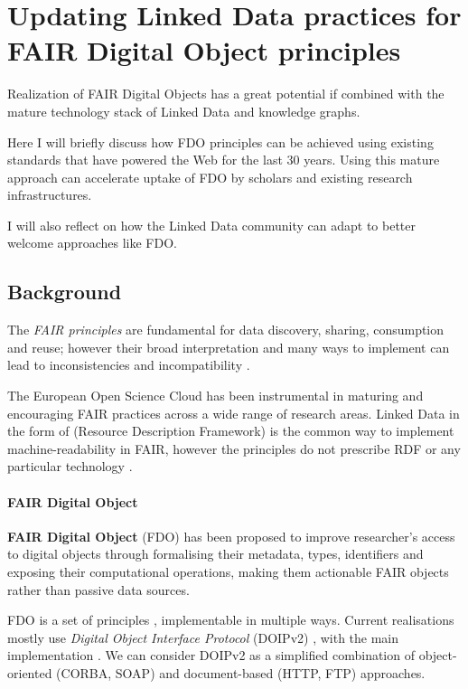 \section{Updating Linked Data practices for FAIR Digital Object
principles}
\label{ch2:updating-linked-data-practices-for-fair-digital-object-principles}

Realization of FAIR Digital Objects has a great potential if combined with the mature technology stack of Linked Data and knowledge graphs.

Here I will briefly discuss how FDO principles can be achieved using existing standards that have powered the Web for the last 30 years. Using this mature approach can accelerate uptake of FDO by scholars and existing research infrastructures.

I will also reflect on how the Linked Data community can adapt to better welcome approaches like FDO.

\subsection{Background}
\label{ch2:background}

The \emph{FAIR principles} \cite{Wilkinson 2016} are
fundamental for data discovery, sharing, consumption and reuse; however
their broad interpretation and many ways to implement can lead to
inconsistencies and incompatibility
\cite{Jacobsen 2020}.

The European Open Science Cloud  has
been instrumental in maturing and encouraging FAIR practices across a
wide range of research areas. Linked Data in the form of
 (Resource Description
Framework) is the common way to implement machine-readability in FAIR,
however the principles do not prescribe RDF or any particular technology
\cite{Mons 2017}.

\paragraph{FAIR Digital Object}
\label{ch2:fair-digital-object}

\textbf{FAIR Digital Object} (FDO)
\cite{Schultes 2019}
has been proposed to improve researcher's access to digital objects
through formalising their metadata, types, identifiers and exposing
their computational operations, making them actionable FAIR objects
rather than passive data sources.

FDO is a set of principles \cite{bonino2019}, implementable in multiple ways. Current realisations mostly
use \emph{Digital Object Interface Protocol} (DOIPv2)
\cite{DONA 2018}, with the
main implementation
. We
can consider DOIPv2 as a simplified combination of object-oriented
(CORBA, SOAP) and document-based (HTTP, FTP) approaches.

